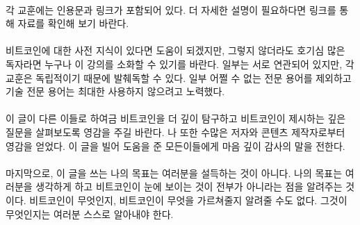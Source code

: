 \paragraph{}
각 교훈에는 인용문과 링크가 포함되어 있다. 더 자세한 설명이 필요하다면 링크를 통해 자료를 확인해 보기
바란다.

\paragraph{}
비트코인에 대한 사전 지식이 있다면 도움이 되겠지만, 
그렇지 않더라도 호기심 많은 독자라면 누구나 이 강의를 소화할 수 있기를 바란다.
일부는 서로 연관되어 있지만, 각 교훈은 독립적이기 때문에 발췌독할 수 있다. 
일부 어쩔 수 없는 전문 용어를 제외하고 기술 전문 용어는 최대한 사용하지 않으려고 노력했다. 

\paragraph{}
이 글이 다른 이들로 하여금 비트코인을 더 깊이 탐구하고 비트코인이 제시하는 깊은 질문을 살펴보도록 영감을 주길 바란다. 
나 또한 수많은 저자와 콘텐츠 제작자로부터 영감을 얻었다. 이 글을 빌어 도움을 준 모든이들에게 마음 깊이 감사의 말을 전한다.


\paragraph{}
마지막으로, 이 글을 쓰는 나의 목표는 여러분을 설득하는 것이 아니다. 
나의 목표는 여러분을 생각하게 하고 비트코인이 눈에 보이는 것이 전부가 아니라는 점을 알려주는 것이다.
비트코인이 무엇인지, 비트코인이 무엇을 가르쳐줄지 알려줄 수도 없다. 
그것이 무엇인지는 여러분 스스로 알아내야 한다.

